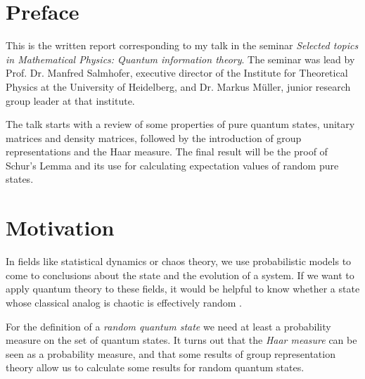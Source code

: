 \documentclass[a4paper,11pt, BCOR=4mm, DIV=12, pagesize]{scrartcl}
\begin{document}
    




\section{Preface}

This is the written report corresponding to my talk in the seminar 
\emph{Selected topics in Mathematical Physics: Quantum information theory}. The 
seminar was lead by Prof. Dr. Manfred Salmhofer, executive director of the 
Institute for Theoretical Physics at the University of Heidelberg, and Dr. 
Markus M\"uller, junior research group leader at that institute. 

The talk starts with a review of some properties of pure quantum states, 
unitary matrices and density matrices, followed by the introduction of group 
representations and the Haar measure. The final result will be the proof of 
Schur's Lemma and its use for calculating expectation values of random pure 
states.

\section{Motivation}

In fields like statistical dynamics or chaos theory, we use probabilistic 
models to come to conclusions about the state and the evolution of a system. 
If we want to apply quantum theory to these fields, it would be helpful to 
know whether a state whose classical analog is chaotic is effectively random 
\cite{wootters}. 

For the definition of a \emph{random quantum state} we need at least a 
probability measure on the set of quantum states. It turns out that the 
\emph{Haar measure} can be seen as a probability measure, and that 
some results of group representation theory allow us to calculate some results 
for random quantum states. 
\end{document}

